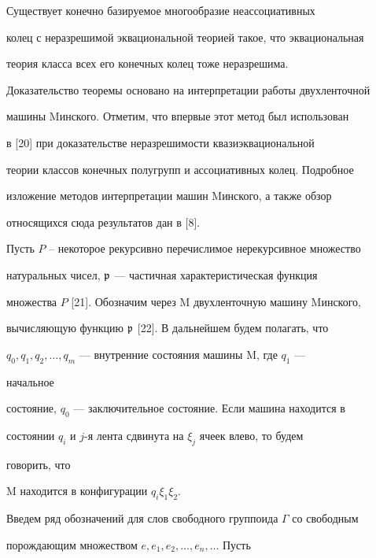  


\begin{thmnonum} 


Существует конечно базируемое многообразие неассоциативных 


колец с неразрешимой эквациональной теорией такое, что эквациональная 


теория класса всех его конечных колец тоже неразрешима. 


\end{thmnonum} 


 


Доказательство теоремы основано на интерпретации работы двухленточной 


машины Mинского. Отметим, что впервые этот метод был использован 


в [20] при доказательстве неразрешимости квазиэквациональной 


теории классов конечных полугрупп и ассоциативных колец. Подробное 


изложение методов интерпретации машин Mинского, а также обзор 


относящихся сюда результатов дан в [8]. 


 


Пусть $P$ -- некоторое рекурсивно перечислимое нерекурсивное множество 


натуральных чисел, $\frak p$ --- частичная характеристическая функция 


множества $P$ [21]. Обозначим через M двухленточную машину Mинского, 


вычисляющую функцию $\frak p$ [22]. В дальнейшем будем полагать, что 


$q_0,q_1,q_2,\dotsc,q_m$ --- внутренние состояния машины M, где $q_1$ --- 


начальное 


состояние, $q_0$ --- заключительное состояние. Если машина находится в 


состоянии $q_i$ и $j$-я лента сдвинута на $\xi_j$ ячеек влево, то будем 


говорить, что 


M находится в конфигурации $q_i\xi_1\xi_2$. 


 


Введем ряд обозначений для слов свободного группоида $\Gamma$ со свободным 


порождающим множеством $e,e_1,e_2,\dotsc,e_n,\dotsc$ Пусть 


